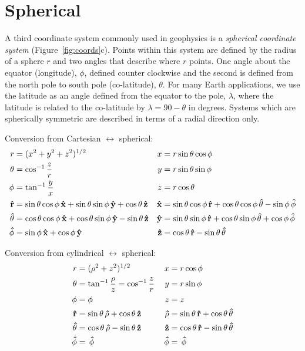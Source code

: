 \section{Spherical}
A third coordinate system commonly used in geophysics is a {\it spherical
coordinate system} (Figure~\ref{fig:coords}c). Points within this system are
defined by the radius of a sphere $r$ and two angles that describe where $r$
points.  One angle about the equator (longitude), $\phi$, defined counter
clockwise and the second is defined from the north pole to south pole
(co-latitude), $\theta$.  For many Earth applications, we use the latitude as an
angle defined from the equator to the pole, $\lambda$, where the latitude is
related to the co-latitude by $\lambda = 90 - \theta$ in degrees.  Systems which
are spherically symmetric are described in terms of a radial direction only.

Conversion from Cartesian $\leftrightarrow$ spherical:
\begin{align*}
    r &= (x^2 + y^2 + z^2)^{1/2} & x &= r \sin \theta \cos \phi \\
    \theta &= \cos^{-1} \frac{z}{r} & y &= r \sin \theta \sin \phi \\
    \phi &= \tan^{-1} \frac{y}{x} & z &= r \cos \theta \\
    \vu{r} &= \sin \theta \cos \phi \,\vu{x} + \sin \theta \sin \phi
        \,\vu{y} + \cos \theta \,\vu{z} &
    \vu{x} &= \sin \theta \cos \phi \,\vu{r} + \cos \theta \cos \phi
        \,\vu{\theta} - \sin \phi \,\vu{\phi} \\
    \vu{\theta} &= \cos \theta \cos \phi \,\vu{x} + \cos \theta \sin \phi
        \,\vu{y} - \sin \theta \,\vu{z} &
    \vu{y} &= \sin \theta \sin \phi \,\vu{r} + \cos \theta \sin \phi
        \,\vu{\theta} + \cos \phi \,\vu{\phi} \\
    \vu{\phi} &= \sin \phi \,\vu{x} + \cos \phi \,\vu{y} &
    \vu{z} &= \cos \theta \,\vu{r} - \sin \theta \,\vu{\theta}
\end{align*}

Conversion from cylindrical $\leftrightarrow$ spherical:
\begin{align*}
    r &= (\rho^2 + z^2)^{1/2} & x &= r \cos \phi \\
    \theta &= \tan^{-1} \frac{\rho}{z} = \cos^{-1} \frac{z}{r} &
        y &= r \sin \phi \\
    \phi &= \phi & z &= z \\
    \vu{r} &= \sin \theta \,\vu{\rho} + \cos \theta \,\vu{z} &
    \vu{\rho} &= \sin \theta \,\vu{r} + \cos \theta \,\vu{\theta} \\
    \vu{\theta} &= \cos \theta \,\vu{\rho} - \sin \theta \,\vu{z} &
    \vu{z} &= \cos \theta \,\vu{r} - \sin \theta \,\vu{\theta} \\
    \vu{\phi} & = \,\vu{\phi} & \,\vu{\phi} &= \,\vu{\phi}
\end{align*}


